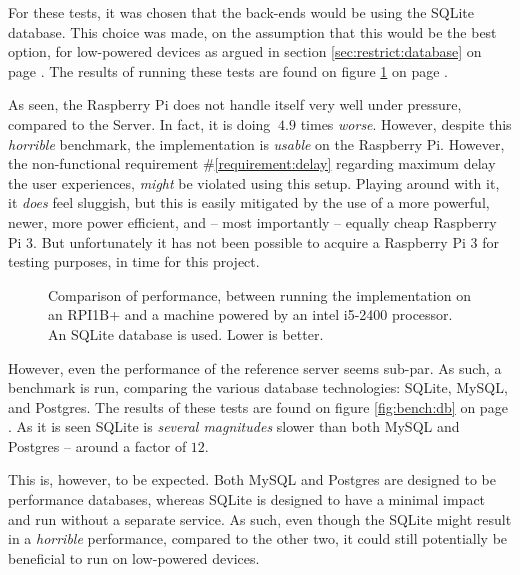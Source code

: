 	For these tests, it was chosen that the back-ends would be using the SQLite database. This choice was made, on the assumption that this would be the best option, for low-powered devices as argued in section \ref{sec:restrict:database} on page \pageref{sec:restrict:database}. The results of running these tests are found on figure \ref{fig:bench:arch} on page \pageref{fig:bench:arch}. 

	As seen, the Raspberry Pi does not handle itself very well under pressure, compared to the Server. In fact, it is doing $~4.9$ times \emph{worse}. However, despite this \emph{horrible} benchmark, the implementation is \emph{usable} on the Raspberry Pi. However, the non-functional requirement \#\ref{requirement:delay} regarding maximum delay the user experiences, \emph{might} be violated using this setup. Playing around with it, it \emph{does} feel sluggish, but this is easily mitigated by the use of a more powerful, newer, more power efficient, and -- most importantly -- equally cheap Raspberry Pi 3. But unfortunately it has not been possible to acquire a Raspberry Pi 3 for testing purposes, in time for this project.

	\begin{figure}[!h]
		\centering
	    \caption{Comparison of performance, between running the implementation on an RPI1B+ and a machine powered by an intel i5-2400 processor. An SQLite database is used. Lower is better.}
	    \label{fig:bench:arch}
	\end{figure}

	However, even the performance of the reference server seems sub-par. As such, a benchmark is run, comparing the various database technologies: SQLite, MySQL, and Postgres. The results of these tests are found on figure \ref{fig:bench:db} on page \pageref{fig:bench:db}. As it is seen SQLite is \emph{several magnitudes} slower than both MySQL and Postgres -- around a factor of $12$.

	This is, however, to be expected. Both MySQL and Postgres are designed to be performance databases, whereas SQLite is designed to have a minimal impact and run without a separate service. As such, even though the SQLite might result in a \emph{horrible} performance, compared to the other two, it could still potentially be beneficial to run on low-powered devices.

